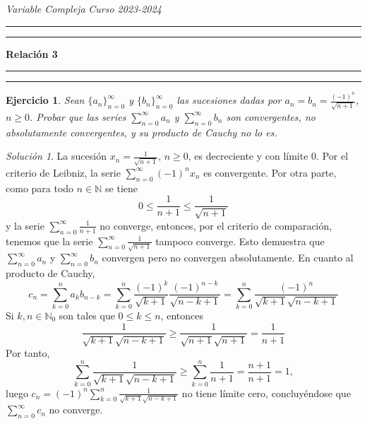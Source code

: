 \documentclass[11pt]{report}
\newcommand{\N}{\mathbb N}
\newcommand{\serie}[2][0]{\sum_{n=#1}^\infty #2}
\newtheorem{exercise}{Ejercicio}
\theoremstyle{remark}
\newtheorem*{resolution}{Solución}
\begin{document}
\textit{Variable Compleja} \hfill \textit{Curso 2023-2024}

\vspace{-5mm}

\begin{center}

	\rule{\textwidth}{1.6pt}\vspace*{-\baselineskip}\vspace*{2pt} %
	\rule{\textwidth}{0.4pt} %
	
	{\LARGE \textbf{Relación 3}} %
	
	\rule[0.66\baselineskip]{\textwidth}{0.4pt}\vspace*{-\baselineskip}\vspace{3.2pt} %
	\rule[0.66\baselineskip]{\textwidth}{1.6pt} %

\end{center}

\begin{exercise}
Sean $\{a_n\}_{n=0}^\infty$ y $\{b_n\}_{n=0}^\infty$ las sucesiones dadas por $a_n = b_n = \frac{(-1)^n}{\sqrt{n+1}}$, $n \geq 0$. Probar que las series $\sum_{n=0}^\infty a_n$ y $\sum_{n=0}^\infty b_n$ son convergentes, no absolutamente convergentes, y su producto de Cauchy no lo es.
\end{exercise}
\begin{resolution}
La sucesión $x_n=\frac{1}{\sqrt{n+1}}$, $n \geq 0$, es decreciente y con límite $0$. Por el criterio de Leibniz, la serie $\serie{(-1)^nx_n}$ es convergente. Por otra parte, como para todo $n \in \N$ se tiene
\[0 \leq \frac{1}{n+1} \leq \frac{1}{\sqrt{n+1}}\]
y la serie $\sum_{n=0}^\infty \frac{1}{n+1}$ no converge, entonces, por el criterio de comparación, tenemos que la serie $\sum_{n=0}^\infty \frac{1}{\sqrt{n+1}}$ tampoco converge. Esto demuestra que $\serie{a_n}$ y $\serie{b_n}$ convergen pero no convergen absolutamente. En cuanto al producto de Cauchy,
\[c_n = \sum_{k=0}^n a_kb_{n-k} = \sum_{k=0}^n\frac{(-1)^k}{\sqrt{k+1}}\frac{(-1)^{n-k}}{\sqrt{n-k+1}} = \sum_{k=0}^n \frac{(-1)^n}{\sqrt{k+1}\sqrt{n-k+1}}\]
Si $k,n \in \N_0$ son tales que $0 \leq k \leq n$, entonces
\[\frac{1}{\sqrt{k+1}\sqrt{n-k+1}} \geq \frac{1}{\sqrt{n+1}\sqrt{n+1}} = \frac{1}{n+1}\]
Por tanto,
\[\sum_{k=0}^n \frac{1}{\sqrt{k+1}\sqrt{n-k+1}} \geq \sum_{k=0}^n \frac{1}{n+1} = \frac{n+1}{n+1} = 1,\]
luego $c_n = (-1)^n \sum_{k=0}^n \frac{1}{\sqrt{k+1}\sqrt{n-k+1}}$ no tiene límite cero, concluyéndose que $\sum_{n=0}^\infty c_n$ no converge.
\end{resolution}
\end{document}
